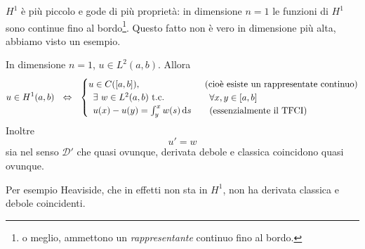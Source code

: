 $H^{1}$ è più piccolo e gode di più proprietà: in dimensione $n=1$ le funzioni di $H^{1}$ sono continue fino al bordo\footnote{o meglio, ammettono un \textit{rappresentante} continuo fino al bordo.}. Questo fatto non è vero in dimensione più alta, abbiamo visto un esempio.
\begin{theorem}
    [Microteorema] In dimensione $n=1$, $u\in L^{2}(a,b)$. Allora
    \begin{equation*}
        u\in H^{1}(a,b) \ \ \Leftrightarrow \ \ \begin{cases}
            u\in C([ a,b]) ,            & \text{(cioè esiste un rappresentate continuo)} \\
            \begin{array}{l}
                \exists \ w\in L^{2}(a,b) \ \text{t.c.} \\
                u(x) -u(y) =\int ^{x}_{y} w(s) \,\mathrm d s
            \end{array} & \begin{array}{l}
                \forall x,y\in [ a,b] \\
                \text{(essenzialmente il TFCI)}
            \end{array}
        \end{cases}
    \end{equation*}
    Inoltre
    \begin{equation*}
        u'=w
    \end{equation*}
    sia nel senso $\mathcal{D} '$ che quasi ovunque, derivata debole e classica coincidono quasi ovunque.
\end{theorem}
Per esempio Heaviside, che in effetti non sta in $H^{1}$, non ha derivata classica e debole coincidenti.


